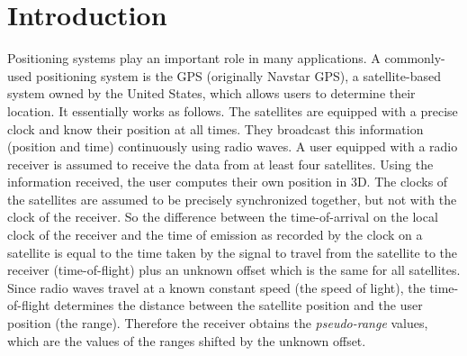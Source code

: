 \documentclass[reqno]{amsart}
\begin{document}
\maketitle


\section*{Introduction} \label{sIntro}%


Positioning systems play an important role in many applications. A commonly-used positioning system is the GPS (originally Navstar GPS), a satellite-based system owned by the United States, which allows users to determine their location. It essentially works as follows. The satellites are equipped with a precise clock and know their position at all times. They broadcast this information (position and time) continuously using radio waves. A user equipped with a radio receiver is assumed to receive the data from at least four satellites. Using the information received, the user computes their own position in 3D. The clocks of the satellites are assumed to be precisely synchronized together, but not with the clock of the receiver.  So the difference between the time-of-arrival on the local clock of the receiver  
and the time of emission as recorded by the clock on a satellite is equal to the time taken by the signal to travel from the satellite to the receiver (time-of-flight) plus an unknown offset which is the same for all satellites. Since radio waves travel at a known constant speed (the speed of light), the time-of-flight determines the distance between the satellite position and the user position (the range). Therefore the receiver obtains the {\em pseudo-range} values, which are the values of the ranges shifted by the unknown offset. 
\end{document}
